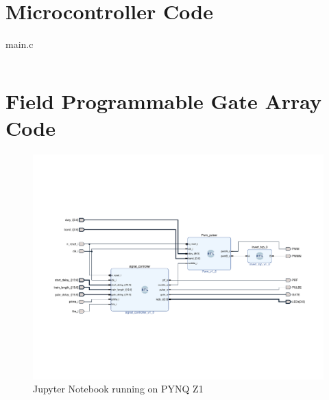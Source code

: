 \section{Microcontroller Code}
\begin{longlisting}
	\caption{main.c}
	\label{lst:main.c}
	\inputminted[bgcolor=LightGray,fontsize=\footnotesize,linenos,breaklines]{c}{Figures/appendix/mcu/main.c}
\end{longlisting}

\section{Field Programmable Gate Array Code}
\begin{figure}[htbp]
	\centering
	\includegraphics[width=\textwidth]{Figures/appendix/fpga/hier_ultrasound_pulser.pdf}
	\caption{Jupyter Notebook running on PYNQ Z1}
	\label{fig:app_jupyter_notebook}
\end{figure}

